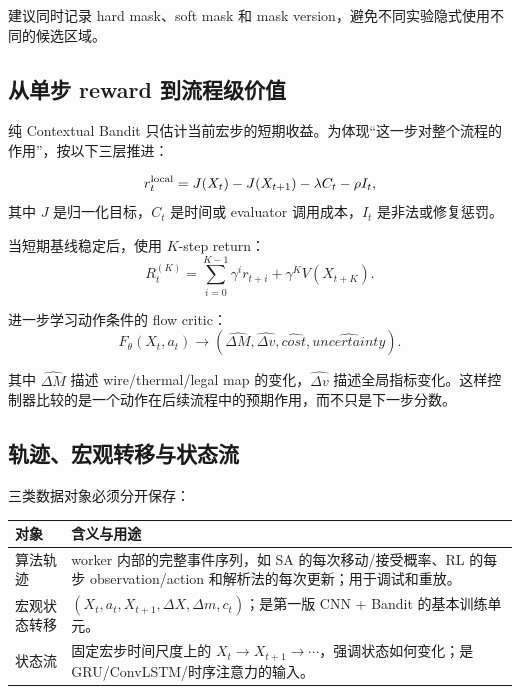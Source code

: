 \documentclass[UTF8,a4paper,11pt]{ctexart}
\begin{document}
建议同时记录 hard mask、soft mask 和 mask version，避免不同实验隐式使用不同的候选区域。

\subsection{从单步 reward 到流程级价值}

纯 Contextual Bandit 只估计当前宏步的短期收益。为体现“这一步对整个流程的作用”，按以下三层推进：

\begin{equation}
r_t^{\rm local}=J(X_t)-J(X_{t+1})-\lambda C_t-\rho I_t,
\end{equation}
其中 \(J\) 是归一化目标，\(C_t\) 是时间或 evaluator 调用成本，\(I_t\) 是非法或修复惩罚。

当短期基线稳定后，使用 \(K\)-step return：
\begin{equation}
R_t^{(K)}=\sum_{i=0}^{K-1}\gamma^i r_{t+i}+\gamma^K V(X_{t+K}).
\end{equation}

进一步学习动作条件的 flow critic：
\begin{equation}
F_\theta(X_t,a_t)\rightarrow
(\widehat{\Delta M},\widehat{\Delta v},\widehat{cost},\widehat{uncertainty}).
\end{equation}

其中 \(\widehat{\Delta M}\) 描述 wire/thermal/legal map 的变化，\(\widehat{\Delta v}\) 描述全局指标变化。这样控制器比较的是一个动作在后续流程中的预期作用，而不只是下一步分数。


\subsection{轨迹、宏观转移与状态流}

三类数据对象必须分开保存：

\begin{table}[htbp]
\centering
\small
\begin{tabularx}{\textwidth}{p{}X}
\toprule
对象 & 含义与用途 \\
\midrule
算法轨迹 & worker 内部的完整事件序列，如 SA 的每次移动/接受概率、RL 的每步 observation/action 和解析法的每次更新；用于调试和重放。 \\
宏观状态转移 & \((X_t,a_t,X_{t+1},\Delta X,\Delta m,c_t)\)；是第一版 CNN + Bandit 的基本训练单元。 \\
状态流 & 固定宏步时间尺度上的 \(X_t\rightarrow X_{t+1}\rightarrow\cdots\)，强调状态如何变化；是 GRU/ConvLSTM/时序注意力的输入。 \\
\bottomrule
\end{tabularx}
\end{table}
\end{document}
